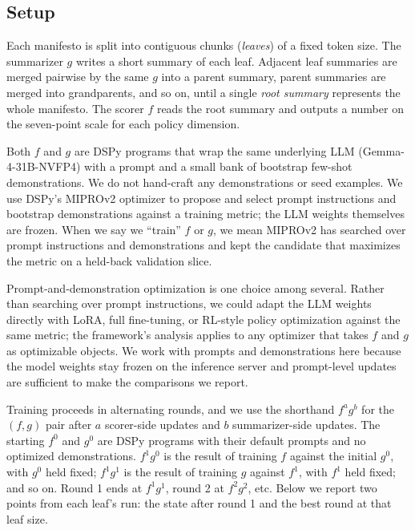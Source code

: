\subsection{Setup}\label{sec:min-manifesto-setup}

Each manifesto is split into contiguous chunks (\emph{leaves}) of a
fixed token size. The summarizer $g$ writes a short summary of each
leaf. Adjacent leaf summaries are merged pairwise by the same $g$
into a parent summary, parent summaries are merged into
grandparents, and so on, until a single \emph{root summary}
represents the whole manifesto. The scorer $f$ reads the root
summary and outputs a number on the seven-point scale for each
policy dimension.

Both $f$ and $g$ are DSPy programs that wrap the same underlying
LLM (Gemma-4-31B-NVFP4) with a prompt and a small bank of bootstrap
few-shot demonstrations. We do not hand-craft any demonstrations or
seed examples. We use DSPy's MIPROv2 optimizer to propose and
select prompt instructions and bootstrap demonstrations against a
training metric; the LLM weights themselves are frozen. When we say
we ``train'' $f$ or $g$, we mean MIPROv2 has searched over prompt
instructions and demonstrations and kept the candidate that
maximizes the metric on a held-back validation slice.

Prompt-and-demonstration optimization is one choice among several.
Rather than searching over prompt instructions, we could adapt the
LLM weights directly with LoRA, full fine-tuning, or RL-style
policy optimization against the same metric; the framework's
analysis applies to any optimizer that takes $f$ and $g$ as
optimizable objects. We work with prompts and demonstrations here
because the model weights stay frozen on the inference server and
prompt-level updates are sufficient to make the comparisons we
report.

Training proceeds in alternating rounds, and we use the shorthand
$f^a g^b$ for the $(f, g)$ pair after $a$ scorer-side updates and
$b$ summarizer-side updates. The starting $f^0$ and $g^0$ are DSPy
programs with their default prompts and no optimized
demonstrations. $f^1 g^0$ is the result of training $f$ against
the initial $g^0$, with $g^0$ held fixed; $f^1 g^1$ is the result
of training $g$ against $f^1$, with $f^1$ held fixed; and so on.
Round 1 ends at $f^1 g^1$, round 2 at $f^2 g^2$, etc. Below we
report two points from each leaf's run: the state after round 1
and the best round at that leaf size.

